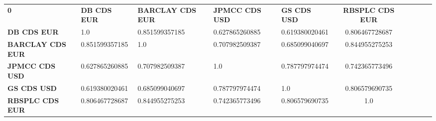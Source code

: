 \begin{center}
 \begin{tabular}{|l|l|l|l|l|c|c|c|c|c|}
\hline
\textbf{0} & \textbf{DB CDS EUR} & \textbf{BARCLAY CDS EUR} & \textbf{JPMCC CDS USD} & \textbf{GS CDS USD} & \textbf{RBSPLC CDS EUR}\\\hhline{|=|=|=|=|=|=|}
\textbf{DB CDS EUR} & 1.0 & 0.851599357185 & 0.627865260885 & 0.619380020461 & 0.806467728687\\
\textbf{BARCLAY CDS EUR} & 0.851599357185 & 1.0 & 0.707982509387 & 0.685099040697 & 0.844955275253\\
\textbf{JPMCC CDS USD} & 0.627865260885 & 0.707982509387 & 1.0 & 0.787797974474 & 0.742365773496\\
\textbf{GS CDS USD} & 0.619380020461 & 0.685099040697 & 0.787797974474 & 1.0 & 0.806579690735\\
\textbf{RBSPLC CDS EUR} & 0.806467728687 & 0.844955275253 & 0.742365773496 & 0.806579690735 & 1.0\\
\hline
\end{tabular}
\end{center}